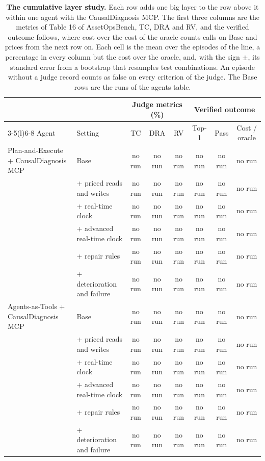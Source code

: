 \documentclass[10pt]{article}
\begin{document}
\begin{table}[H]\centering\footnotesize
\caption{\textbf{The cumulative layer study.} Each row adds one big layer to the row above it within one agent with the CausalDiagnosis MCP. The first three columns are the metrics of Table 16 of AssetOpsBench, TC, DRA and RV, and the verified outcome follows, where cost over the cost of the oracle counts calls on Base and prices from the next row on. Each cell is the mean over the episodes of the line, a percentage in every column but the cost over the oracle, and, with the sign $\pm$, its standard error from a bootstrap that resamples test combinations. An episode without a judge record counts as false on every criterion of the judge. The Base rows are the runs of the agents table.}
\label{tab:ladder}
\setlength{\tabcolsep}{3pt}
\begin{tabular}{llcccccc}
\toprule
 & & \multicolumn{3}{c}{Judge metrics (\%)} & \multicolumn{3}{c}{Verified outcome} \\
\cmidrule(lr){3-5}\cmidrule(l){6-8}
Agent & Setting & TC & DRA & RV & Top-1 & Pass & Cost / oracle \\
\midrule
Plan-and-Execute + CausalDiagnosis MCP & Base & no run & no run & no run & no run & no run & no run \\
 & + priced reads and writes & no run & no run & no run & no run & no run & no run \\
 & + real-time clock & no run & no run & no run & no run & no run & no run \\
 & + advanced real-time clock & no run & no run & no run & no run & no run & no run \\
 & + repair rules & no run & no run & no run & no run & no run & no run \\
 & + deterioration and failure & no run & no run & no run & no run & no run & no run \\
\midrule
Agents-as-Tools + CausalDiagnosis MCP & Base & no run & no run & no run & no run & no run & no run \\
 & + priced reads and writes & no run & no run & no run & no run & no run & no run \\
 & + real-time clock & no run & no run & no run & no run & no run & no run \\
 & + advanced real-time clock & no run & no run & no run & no run & no run & no run \\
 & + repair rules & no run & no run & no run & no run & no run & no run \\
 & + deterioration and failure & no run & no run & no run & no run & no run & no run \\

\end{tabular}
\end{table}
\end{document}
